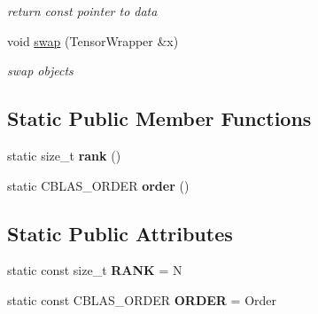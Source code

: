\begin{DoxyCompactItemize}
\begin{DoxyCompactList}\small\item\em return const pointer to data \item\end{DoxyCompactList}\item 
\hypertarget{classbtas_1_1_tensor_wrapper_3_01_t_01_5_00_01_n_00_01_order_01_4_acdf02ab05acab5f582f2d75a30ab35c7}{
void \hyperlink{classbtas_1_1_tensor_wrapper_3_01_t_01_5_00_01_n_00_01_order_01_4_acdf02ab05acab5f582f2d75a30ab35c7}{swap} (TensorWrapper \&x)}
\label{classbtas_1_1_tensor_wrapper_3_01_t_01_5_00_01_n_00_01_order_01_4_acdf02ab05acab5f582f2d75a30ab35c7}

\begin{DoxyCompactList}\small\item\em swap objects \item\end{DoxyCompactList}\end{DoxyCompactItemize}
\subsection*{Static Public Member Functions}
\begin{DoxyCompactItemize}
\item 
\hypertarget{classbtas_1_1_tensor_wrapper_3_01_t_01_5_00_01_n_00_01_order_01_4_ac4e2990ed8f3bfcd57b32a3fdc71abe6}{
static size\_\-t {\bfseries rank} ()}
\label{classbtas_1_1_tensor_wrapper_3_01_t_01_5_00_01_n_00_01_order_01_4_ac4e2990ed8f3bfcd57b32a3fdc71abe6}

\item 
\hypertarget{classbtas_1_1_tensor_wrapper_3_01_t_01_5_00_01_n_00_01_order_01_4_a3de3bbc6cc21e1b9a50c65e960f11604}{
static CBLAS\_\-ORDER {\bfseries order} ()}
\label{classbtas_1_1_tensor_wrapper_3_01_t_01_5_00_01_n_00_01_order_01_4_a3de3bbc6cc21e1b9a50c65e960f11604}

\end{DoxyCompactItemize}
\subsection*{Static Public Attributes}
\begin{DoxyCompactItemize}
\item 
\hypertarget{classbtas_1_1_tensor_wrapper_3_01_t_01_5_00_01_n_00_01_order_01_4_a53d415084f75d5deb3fbed2d56379ef1}{
static const size\_\-t {\bfseries RANK} = N}
\label{classbtas_1_1_tensor_wrapper_3_01_t_01_5_00_01_n_00_01_order_01_4_a53d415084f75d5deb3fbed2d56379ef1}

\item 
\hypertarget{classbtas_1_1_tensor_wrapper_3_01_t_01_5_00_01_n_00_01_order_01_4_af244734e5ea6fa81ef27f66baa88029b}{
static const CBLAS\_\-ORDER {\bfseries ORDER} = Order}
\label{classbtas_1_1_tensor_wrapper_3_01_t_01_5_00_01_n_00_01_order_01_4_af244734e5ea6fa81ef27f66baa88029b}

\end{DoxyCompactItemize}



